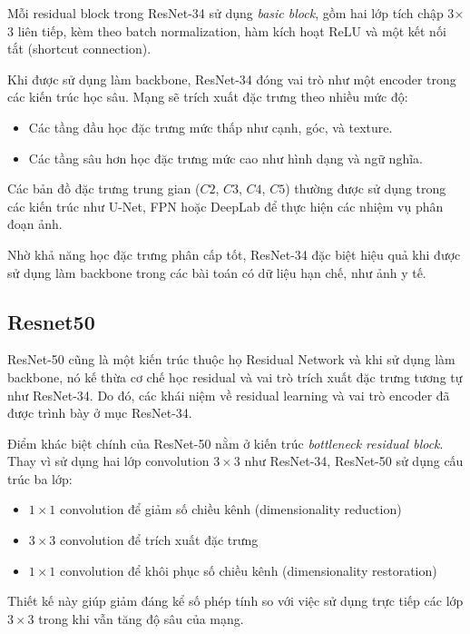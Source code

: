 Mỗi residual block trong ResNet-34 sử dụng \textit{basic block}, gồm hai lớp tích chập 3$\times$3 liên tiếp, kèm theo batch normalization, hàm kích hoạt ReLU và một kết nối tắt (shortcut connection).

Khi được sử dụng làm backbone, ResNet-34 đóng vai trò như một encoder trong các kiến trúc học sâu. Mạng sẽ trích xuất đặc trưng theo nhiều mức độ:

\begin{itemize}
    \item Các tầng đầu học đặc trưng mức thấp như cạnh, góc, và texture.
    \item Các tầng sâu hơn học đặc trưng mức cao như hình dạng và ngữ nghĩa.
\end{itemize}

Các bản đồ đặc trưng trung gian ($C2$, $C3$, $C4$, $C5$) thường được sử dụng trong các kiến trúc như U-Net, FPN hoặc DeepLab để thực hiện các nhiệm vụ phân đoạn ảnh.

Nhờ khả năng học đặc trưng phân cấp tốt, ResNet-34 đặc biệt hiệu quả khi được sử dụng làm backbone trong các bài toán có dữ liệu hạn chế, như ảnh y tế.

\subsection{Resnet50}

ResNet-50 cũng là một kiến trúc thuộc họ Residual Network và khi sử dụng làm backbone, nó kế thừa cơ chế học residual và vai trò trích xuất đặc trưng tương tự như ResNet-34. Do đó, các khái niệm về residual learning và vai trò encoder đã được trình bày ở mục ResNet-34.

Điểm khác biệt chính của ResNet-50 nằm ở kiến trúc \textit{bottleneck residual block}. Thay vì sử dụng hai lớp convolution $3 \times 3$ như ResNet-34, ResNet-50 sử dụng cấu trúc ba lớp:

\begin{itemize}
    \item $1 \times 1$ convolution để giảm số chiều kênh (dimensionality reduction)
    \item $3 \times 3$ convolution để trích xuất đặc trưng
    \item $1 \times 1$ convolution để khôi phục số chiều kênh (dimensionality restoration)
\end{itemize}

Thiết kế này giúp giảm đáng kể số phép tính so với việc sử dụng trực tiếp các lớp $3 \times 3$ trong khi vẫn tăng độ sâu của mạng.

